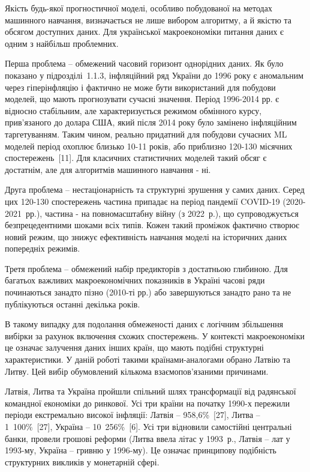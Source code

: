 \documentclass{bachelor_thesis}
\begin{document}
Якість будь-якої прогностичної моделі, особливо побудованої на методах машинного навчання, визначається не лише вибором алгоритму, а й якістю та обсягом доступних даних. Для української макроекономіки питання даних є одним з найбільш проблемних.

Перша проблема -- обмежений часовий горизонт однорідних даних. Як було показано у підрозділі~1.1.3, інфляційний ряд України до 1996 року є аномальним через гіперінфляцію і фактично не може бути використаний для побудови моделей, що мають прогнозувати сучасні значення. Період 1996-2014 рр. є відносно стабільним, але характеризується режимом обмінного курсу, прив’язаного до долара США, який після 2014 року було замінено інфляційним таргетуванням. Таким чином, реально придатний для побудови сучасних ML моделей період охоплює близько 10-11 років, або приблизно 120-130 місячних спостережень~[11]. Для класичних статистичних моделей такий обсяг є достатнім, але для алгоритмів машинного навчання - ні.

Друга проблема -- нестаціонарність та структурні зрушення у самих даних. Серед цих 120-130 спостережень частина припадає на період пандемії COVID-19 (2020-2021~рр.), частина - на повномасштабну війну (з 2022~р.), що супроводжується безпрецедентними шоками всіх типів. Кожен такий проміжок фактично створює новий режим, що знижує ефективність навчання моделі на історичних даних попередніх режимів.

Третя проблема -- обмежений набір предикторів з достатньою глибиною. Для багатьох важливих макроекономічних показників в Україні часові ряди починаються занадто пізно (2010-ті рр.) або завершуються занадто рано та не публікуються останні декілька років.

В такому випадку для подолання обмеженості даних є логічним збільшення вибірки за рахунок включення схожих спостережень. У контексті макроекономіки це означає залучення даних інших країн, що мають подібні структурні характеристики. У даній роботі такими країнами-аналогами обрано Латвію та Литву. Цей вибір обумовлений кількома взаємопов'язаними причинами.

Латвія, Литва та Україна пройшли спільний шлях трансформації від радянської командної економіки до ринкової. Усі три країни на початку 1990-х пережили періоди екстремально високої інфляції: Латвія -- 958,6\%~[27], Литва -- 1~100\%~[27], Україна -- 10~256\%~[6]. Усі три відновили самостійні центральні банки, провели грошові реформи (Литва ввела літас у 1993~р., Латвія -- лат у 1993-му, Україна -- гривню у 1996-му). Це означає принципову подібність структурних викликів у монетарній сфері.
\end{document}
